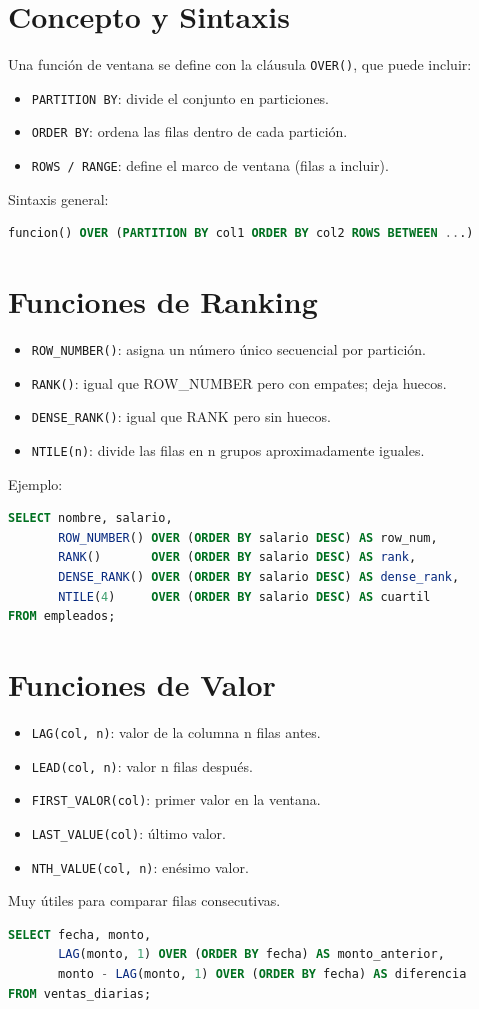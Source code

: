 \documentclass[12pt,a4paper,openany,oneside]{book}
\begin{document}
\section{Concepto y Sintaxis}
Una función de ventana se define con la cláusula \texttt{OVER()}, que puede incluir:
\begin{itemize}
    \item \texttt{PARTITION BY}: divide el conjunto en particiones.
    \item \texttt{ORDER BY}: ordena las filas dentro de cada partición.
    \item \texttt{ROWS / RANGE}: define el marco de ventana (filas a incluir).
\end{itemize}
Sintaxis general:
\begin{lstlisting}[language=SQL]
funcion() OVER (PARTITION BY col1 ORDER BY col2 ROWS BETWEEN ...)
\end{lstlisting}

\section{Funciones de Ranking}
\begin{itemize}
    \item \texttt{ROW\_NUMBER()}: asigna un número único secuencial por partición.
    \item \texttt{RANK()}: igual que ROW\_NUMBER pero con empates; deja huecos.
    \item \texttt{DENSE\_RANK()}: igual que RANK pero sin huecos.
    \item \texttt{NTILE(n)}: divide las filas en n grupos aproximadamente iguales.
\end{itemize}
Ejemplo:
\begin{lstlisting}[language=SQL]
SELECT nombre, salario,
       ROW_NUMBER() OVER (ORDER BY salario DESC) AS row_num,
       RANK()       OVER (ORDER BY salario DESC) AS rank,
       DENSE_RANK() OVER (ORDER BY salario DESC) AS dense_rank,
       NTILE(4)     OVER (ORDER BY salario DESC) AS cuartil
FROM empleados;
\end{lstlisting}

\section{Funciones de Valor}
\begin{itemize}
    \item \texttt{LAG(col, n)}: valor de la columna n filas antes.
    \item \texttt{LEAD(col, n)}: valor n filas después.
    \item \texttt{FIRST\_VALOR(col)}: primer valor en la ventana.
    \item \texttt{LAST\_VALUE(col)}: último valor.
    \item \texttt{NTH\_VALUE(col, n)}: enésimo valor.
\end{itemize}
Muy útiles para comparar filas consecutivas.
\begin{lstlisting}[language=SQL]
SELECT fecha, monto,
       LAG(monto, 1) OVER (ORDER BY fecha) AS monto_anterior,
       monto - LAG(monto, 1) OVER (ORDER BY fecha) AS diferencia
FROM ventas_diarias;
\end{lstlisting}
\end{document}
